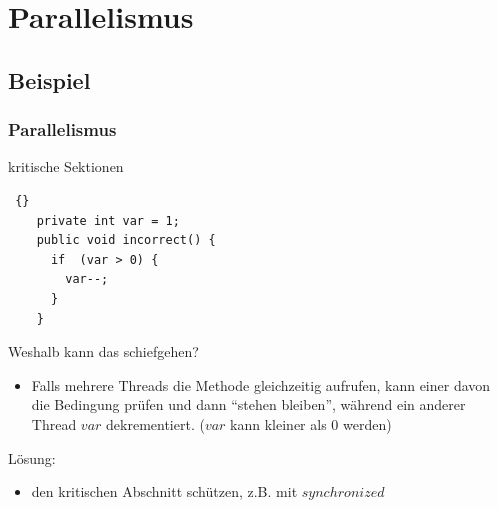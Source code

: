 
\section{Parallelismus}

\subsection{Beispiel}
\begin{frame}[fragile]
\frametitle {Parallelismus} 
	\begin{block} {kritische Sektionen}

	\begin{lstlisting} {}
	private int var = 1;
	public void incorrect() {
	  if  (var > 0) {
  	    var--;
	  }
	}
	\end{lstlisting}
	
	Weshalb kann das schiefgehen? \\
		\visible<2-> {
		\begin{itemize}
			\item Falls mehrere Threads die Methode gleichzeitig aufrufen, kann einer davon die Bedingung 				prüfen und dann ``stehen bleiben'', während ein anderer Thread $var$ dekrementiert. ($var$ 				kann kleiner als 0 werden)\\
		\end{itemize}
		}
	Lösung: 
		\visible<3-> {
		\begin{itemize}
			\item den kritischen Abschnitt schützen, z.B. mit $synchronized$ 
		\end{itemize}
		}
	\end{block} 
\end{frame}

